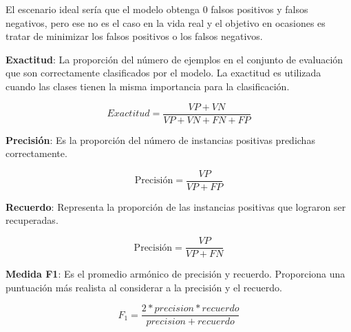 El escenario ideal sería que el modelo obtenga $0$ falsos positivos y falsos negativos, pero ese no es el caso en la vida real y el objetivo en ocasiones es tratar de minimizar los falsos positivos o los falsos negativos.

\textbf{Exactitud}: La proporción del número de ejemplos en el conjunto de evaluación que son correctamente clasificados por el modelo. La exactitud es utilizada cuando las clases tienen la misma importancia para la clasificación.

\begin{equation} \label{eq:acc}
Exactitud = \frac{VP + VN}{VP + VN+ FN+FP}    
\end{equation}

\textbf{Precisión}: Es la proporción del número de instancias positivas predichas correctamente.

\begin{equation} \label{eq:precc}
\text{Precisión} = \frac{VP}{VP+FP}    
\end{equation}

\textbf{Recuerdo}: Representa la proporción de las instancias positivas que lograron ser recuperadas.

\begin{equation} \label{eq:recc}
\text{Precisión} = \frac {VP}{VP+FN}    
\end{equation}

\textbf{Medida F1}: Es el promedio armónico de precisión y recuerdo. Proporciona una puntuación más realista al considerar a la precisión y el recuerdo.

\begin{equation} \label{eq:f1}
F_1= \frac{2 * precision * recuerdo}{precision+recuerdo}   
\end{equation}